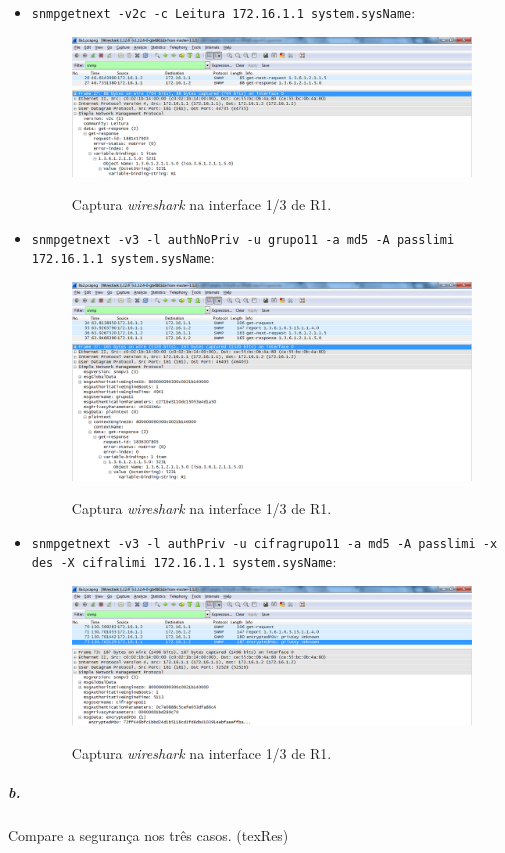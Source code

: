 \begin{itemize}
\item \texttt{snmpgetnext -v2c -c Leitura 172.16.1.1 system.sysName}:

\begin{figure}[h]
\centering
\includegraphics[width=1\textwidth, height=0.33\textheight]{8a1.png}
\label{fig:14-capturaWireshark}
\caption{Captura \emph{wireshark} na interface \textsf{1/3} de \textsf{R1}.}
\end{figure}


\item \texttt{snmpgetnext -v3 -l authNoPriv -u grupo11 -a md5 -A passlimi 172.16.1.1 system.sysName}:

\begin{figure}[h]
\centering
\includegraphics[width=1\textwidth, height=0.33\textheight]{8a2.png}
\label{fig:15-capturaWireshark}
\caption{Captura \emph{wireshark} na interface \textsf{1/3} de \textsf{R1}.}
\end{figure}


\item \texttt{snmpgetnext -v3 -l authPriv -u cifragrupo11 -a md5 -A passlimi -x des -X cifralimi 172.16.1.1 system.sysName}:

\begin{figure}[h]
\centering
\includegraphics[width=1\textwidth, height=0.33\textheight]{8a3.png}
\label{fig:16-capturaWireshark}
\caption{Captura \emph{wireshark} na interface \textsf{1/3} de \textsf{R1}.}
\end{figure}

\end{itemize}


\subparagraph{b.}
Compare a segurança nos três casos. (texRes)